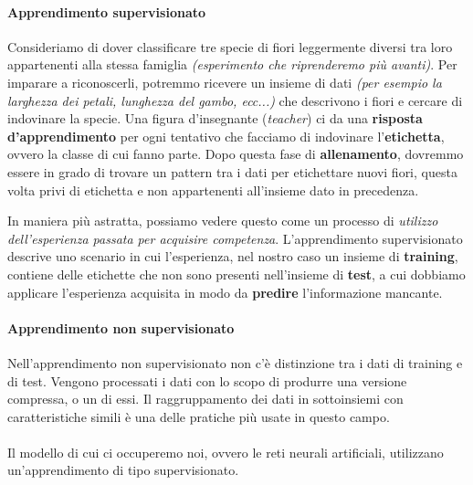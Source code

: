 \documentclass[12pt, twoside, letterpaper]{report}
\begin{document}
				\paragraph{Apprendimento supervisionato} Consideriamo di dover classificare tre specie di fiori leggermente diversi tra loro appartenenti alla stessa famiglia \textit{(esperimento che riprenderemo più avanti)}. Per imparare a riconoscerli, potremmo ricevere un insieme di dati \textit{(per esempio la larghezza dei petali, lunghezza del gambo, ecc...)} che descrivono i fiori e cercare di indovinare la specie. Una figura d'insegnante (\textit{teacher}) ci da una \textbf{risposta d'apprendimento} per ogni tentativo che facciamo di indovinare l'\textbf{etichetta}, ovvero la classe di cui fanno parte. Dopo questa fase di \textbf{allenamento}, dovremmo essere in grado di trovare un pattern tra i dati per etichettare nuovi fiori, questa volta privi di etichetta e non appartenenti all'insieme dato in precedenza. 
				
					In maniera più astratta, possiamo vedere questo come un processo di \textit{utilizzo dell'esperienza passata per acquisire competenza}. L'apprendimento supervisionato descrive uno scenario in cui l'esperienza, nel nostro caso un insieme di \textbf{training}, contiene delle etichette che non sono presenti nell'insieme di \textbf{test}, a cui dobbiamo applicare l'esperienza acquisita in modo da \textbf{predire} l'informazione mancante.
				
				\paragraph{Apprendimento non supervisionato}  Nell'apprendimento non supervisionato non c'è distinzione tra i dati di training e di test. Vengono processati i dati con lo scopo di produrre una versione compressa, o un  di essi. Il raggruppamento dei dati in sottoinsiemi con caratteristiche simili è una delle pratiche più usate in questo campo.\\\\
				Il modello di cui ci occuperemo noi, ovvero le reti neurali artificiali, utilizzano un'apprendimento di tipo supervisionato.
				
				
\end{document}

